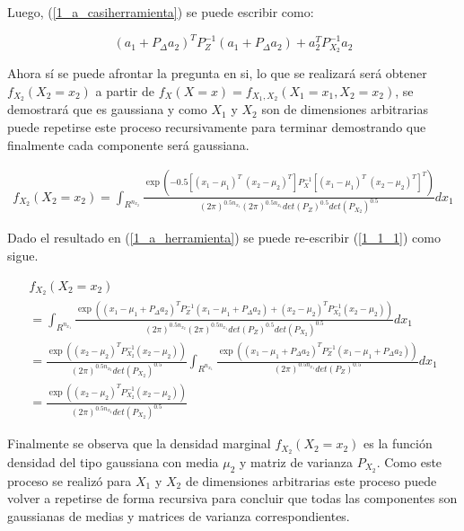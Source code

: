 		Luego, (\ref{1_a_casiherramienta}) se puede escribir como:

		\begin{equation}
			(a_1 + P_{\Delta} a_2)^T P_Z^{-1} (a_1 + P_{\Delta} a_2) + a_2^TP_{X_2}^{-1} a_2
			\label{1_a_herramienta}
		\end{equation}

		Ahora sí se puede afrontar la pregunta en si, lo que se realizará será obtener $f_{X_2}(X_2 = x_2)$ a partir de $f_X(X=x) = f_{X_1,X_2}(X_1=x_1,X_2=x_2)$, se demostrará que es gaussiana y como $X_1$ y $X_2$ son de dimensiones arbitrarias puede repetirse este proceso recursivamente para terminar demostrando que finalmente cada componente será gaussiana.

		\begin{eqnarray}
			f_{X_2}(X_2=x_2) = \int_{ R^{ n_{ x_2 } } } \frac{ \exp(-0.5[(x_1 - \mu_1)^T \; (x_2 - \mu_2)^T] P_X^{-1}[(x_1 - \mu_1)^T \; (x_2 - \mu_2)^T]^T ) }{ (2\pi)^{0.5n_{x_1}} (2\pi)^{0.5n_{x_1}} det(P_Z)^{0.5}det(P_{X_2})^{0.5} }   dx_1
			\label{1_1_1}
		\end{eqnarray}

		Dado el resultado en (\ref{1_a_herramienta}) se puede re-escribir (\ref{1_1_1}) como sigue.

		\begin{eqnarray}
			f_{X_2}(X_2=x_2) \\
			= \int_{ R^{ n_{ x_1 } } } \frac{ \exp((x_1 - \mu_1 + P_{\Delta} a_2)^T P_Z^{-1} (x_1 - \mu_1 + P_{\Delta} a_2) + (x_2 - \mu_2)^T P_{X_2}^{-1} (x_2 - \mu_2) )}{ (2\pi)^{0.5n_{x_2}} (2\pi)^{0.5n_{x_1}} det(P_Z)^{0.5}det(P_{X_2})^{0.5} }   dx_1 \\
			= \frac{ \exp((x_2 - \mu_2)^T P_{X_2}^{-1} (x_2 - \mu_2)) } { (2\pi)^{0.5n_{x_2}} det(P_{X_2})^{0.5} }  \int_{ R^{ n_{ x_1 } } } \frac{ \exp( (x_1 - \mu_1 + P_{\Delta} a_2)^T P_Z^{-1} (x_1 - \mu_1 + P_{\Delta} a_2) ) }{ (2\pi)^{0.5n_{x_1}} det(P_Z)^{0.5} }   dx_1 \\
			= \frac{ \exp((x_2 - \mu_2)^T P_{X_2}^{-1} (x_2 - \mu_2)) } { (2\pi)^{0.5n_{x_2}} det(P_{X_2})^{0.5} }
		\end{eqnarray}

		Finalmente se observa que la densidad marginal $f_{X_2}(X_2=x_2)$ es la función densidad del tipo gaussiana con media $\mu_2$ y matriz de varianza $P_{X_2}$. Como este proceso se realizó para $X_1$ y $X_2$ de dimensiones arbitrarias este proceso puede volver a repetirse de forma recursiva para concluir que todas las componentes son gaussianas de medias  y matrices de varianza correspondientes.

